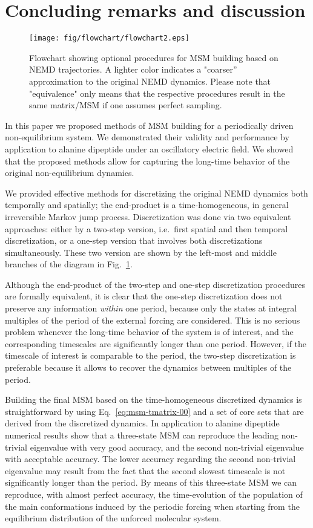 \documentclass[aps, pre, preprint,unsortedaddress,a4paper,onecolumn,showkeys]{revtex4}
\begin{document}
\section{Concluding remarks and discussion}
\label{sec:conclusion}

\begin{figure}
  \centering
  \texttt{[image: fig/flowchart/flowchart2.eps]}
  \caption{Flowchart showing optional procedures for MSM building based on NEMD trajectories. A lighter color indicates
  a "coarser'' approximation to the original NEMD dynamics. Please note that "equivalence" only means that the respective procedures result in the same matrix/MSM if one assumes perfect sampling.}
  \label{fig:flowchart}
\end{figure}

In this paper we proposed methods of MSM building for a periodically driven
non-equilibrium system. We demonstrated their validity and performance by application to  alanine dipeptide under an oscillatory electric field. We showed that the proposed 
methods allow for capturing the long-time behavior of the original
non-equilibrium dynamics.

We provided effective methods for discretizing the original NEMD dynamics
both temporally and spatially; the end-product is a time-homogeneous, in general irreversible Markov jump process.
Discretization was done via two equivalent approaches:
either by a two-step version,
i.e.~first spatial and then temporal discretization,
or a one-step version that involves both discretizations simultaneously.
These two version are shown by the left-most and middle branches of the diagram  in Fig.~\ref{fig:flowchart}.

Although the end-product of the two-step and one-step discretization procedures are formally equivalent,
it is clear that the one-step discretization does not preserve any information
\emph{within} one period, because only the states
at integral multiples of the period of the external forcing are considered. This is no serious problem
whenever the long-time behavior of the system is of interest, and
the corresponding timescales are significantly longer than one
period. However, if the timescale of interest 
is comparable to the period, the two-step
discretization is preferable because it allows to recover the dynamics between multiples of
the period. 

Building the final MSM based on the time-homogeneous discretized dynamics is straightforward by
using Eq.~\eqref{eq:msm-tmatrix-00} and a set of core sets that are
derived from the discretized dynamics.  In application to alanine dipeptide numerical
results show that a three-state MSM can reproduce the leading non-trivial
eigenvalue with very good accuracy, and the second non-trivial
eigenvalue with acceptable accuracy. The lower accuracy regarding the
second non-trivial eigenvalue may result from the fact that the second
slowest timescale is not significantly longer than the period. By means of
this three-state MSM we can reproduce, with almost perfect
accuracy, the time-evolution of the population of the main conformations induced by the periodic forcing when starting from the  
equilibrium distribution of the unforced molecular system.
\end{document}

